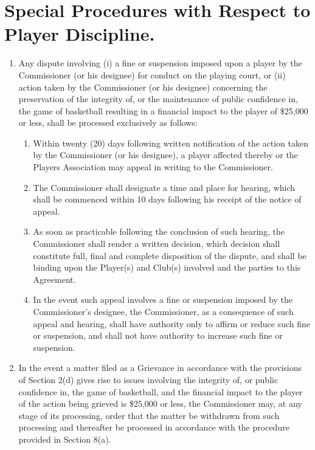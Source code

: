 \documentclass[
]{book}
\providecommand{\tightlist}{%
  \setlength{\itemsep}{0pt}\setlength{\parskip}{0pt}}
\begin{document}
\hypertarget{special-procedures-with-respect-to-player-discipline.}{%
\section{Special Procedures with Respect to Player Discipline.}\label{special-procedures-with-respect-to-player-discipline.}}

\begin{enumerate}
\def\labelenumi{(\alph{enumi})}
\tightlist
\item
  Any dispute involving (i) a fine or suspension imposed upon a player by the Commissioner (or his designee) for conduct on the playing court, or (ii) action taken by the Commissioner (or his designee) concerning the preservation of the integrity of, or the maintenance of public confidence in, the game of basketball resulting in a financial impact to the player of \$25,000 or less, shall be processed exclusively as follows:

  \begin{enumerate}
  \def\labelenumii{(\roman{enumii})}
  \tightlist
  \item
    Within twenty (20) days following written notification of the action taken by the Commissioner (or his designee), a player affected thereby or the Players Association may appeal in writing to the Commissioner.
  \item
    The Commissioner shall designate a time and place for hearing, which shall be commenced within 10 days following his receipt of the notice of appeal.
  \item
    As soon as practicable following the conclusion of such hearing, the Commissioner shall render a written decision, which decision shall constitute full, final and complete disposition of the dispute, and shall be binding upon the Player(s) and Club(s) involved and the parties to this Agreement.
  \item
    In the event such appeal involves a fine or suspension imposed by the Commissioner's designee, the Commissioner, as a consequence of such appeal and hearing, shall have authority only to affirm or reduce such fine or suspension, and shall not have authority to increase such fine or suspension.
  \end{enumerate}
\item
  In the event a matter filed as a Grievance in accordance with the provisions of Section 2(d) gives rise to issues involving the integrity of, or public confidence in, the game of basketball, and the financial impact to the player of the action being grieved is \$25,000 or less, the Commissioner may, at any stage of its processing, order that the matter be withdrawn from such processing and thereafter be processed in accordance with the procedure provided in Section 8(a).
\end{enumerate}
\end{document}

